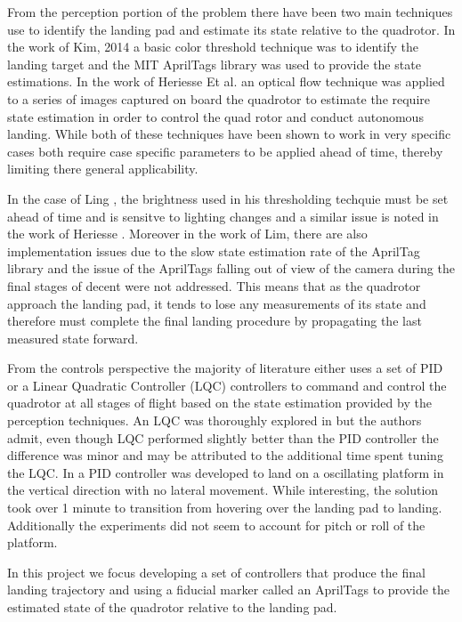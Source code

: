 \documentclass[11pt, twocolumn]{article}
\begin{document}
From the perception portion of the problem there have been two main techniques use to identify the landing pad and estimate its state relative to the quadrotor. In the work of Kim, 2014 \cite{Kim2014} a basic color threshold technique was to identify the landing target and the MIT AprilTags library \cite{apriltags} was used to provide the state estimations. In the work of Heriesse Et al. \cite{Herisse2012} an optical flow technique was applied to a series of images captured on board the quadrotor to estimate the require state estimation in order to control the quad rotor and conduct autonomous landing. While both of these techniques have been shown to work in very specific cases both require case specific parameters to be applied ahead of time, thereby limiting there general applicability. 

In the case of Ling \cite{Kim2014}, the brightness used in his thresholding techquie must be set ahead of time and is sensitve to lighting changes and a similar issue is noted in the work of Heriesse \cite{Herisse2012}. Moreover in the work of Lim, there are also implementation issues due to the slow state estimation rate of the AprilTag library and the issue of the AprilTags falling out of view of the camera during the final stages of decent were not addressed. This means that as the quadrotor approach the landing pad, it tends to lose any measurements of its state and therefore must complete the final landing procedure by propagating the last measured state forward. 

From the controls perspective the majority of literature either uses a set of PID or a Linear Quadratic Controller (LQC) controllers to command and control the quadrotor at all stages of flight based on the state estimation provided by the perception techniques. An LQC was thoroughly explored in \cite{Friis2009} but the authors admit, even though LQC performed slightly better than the PID controller the difference was minor and may be attributed to the additional time spent tuning the LQC. In \cite{Herisse2012} a PID controller was developed to land on a oscillating platform in the vertical direction with no lateral movement. While interesting, the solution took over 1 minute to transition from hovering over the landing pad to landing. Additionally the experiments did not seem to account for pitch or roll of the platform. 

In this project we focus developing a set of controllers that produce the final landing trajectory and using a fiducial marker called an AprilTags \cite{apriltags} to provide the estimated state of the quadrotor relative to the landing pad. 
\end{document}

